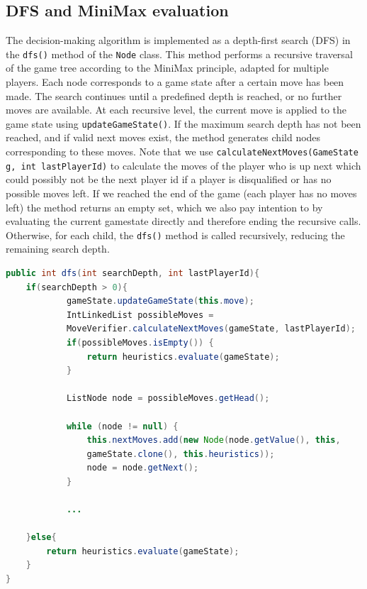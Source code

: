 \subsection*{DFS and MiniMax evaluation}

\noindent The decision-making algorithm is implemented as a depth-first search (DFS) in the \texttt{dfs()} method of the \texttt{Node} class. This method performs a recursive traversal of the game tree according to the MiniMax principle, adapted for multiple players. Each node corresponds to a game state after a certain move has been made. The search continues until a predefined depth is reached, or no further moves are available. At each recursive level, the current move is applied to the game state using \texttt{updateGameState()}. If the maximum search depth has not been reached, and if valid next moves exist, the method generates child nodes corresponding to these moves. Note that we use \texttt{calculateNextMoves(GameState g, int lastPlayerId)} to calculate the moves of the player who is up next which could possibly not be the next player id if a player is disqualified or has no possible moves left. If we reached the end of the game (each player has no moves left) the method returns an empty set, which we also pay intention to by evaluating the current gamestate directly and therefore ending the recursive calls. Otherwise, for each child, the \texttt{dfs()} method is called recursively, reducing the remaining search depth.

\begin{lstlisting}[language=Java,basicstyle=\ttfamily\small]
public int dfs(int searchDepth, int lastPlayerId){
    if(searchDepth > 0){
            gameState.updateGameState(this.move);
            IntLinkedList possibleMoves = 
            MoveVerifier.calculateNextMoves(gameState, lastPlayerId);
            if(possibleMoves.isEmpty()) {
                return heuristics.evaluate(gameState);
            }

            ListNode node = possibleMoves.getHead();

            while (node != null) {
                this.nextMoves.add(new Node(node.getValue(), this, 
                gameState.clone(), this.heuristics));
                node = node.getNext();
            }
            
            ...
            
    }else{
        return heuristics.evaluate(gameState);
    }
}
\end{lstlisting}

